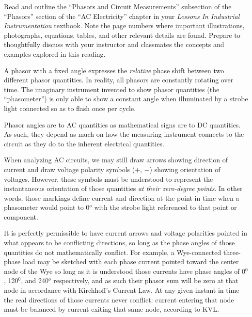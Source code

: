 

Read and outline the ``Phasors and Circuit Measurements'' subsection of the ``Phasors'' section of the ``AC Electricity'' chapter in your {\it Lessons In Industrial Instrumentation} textbook.  Note the page numbers where important illustrations, photographs, equations, tables, and other relevant details are found.  Prepare to thoughtfully discuss with your instructor and classmates the concepts and examples explored in this reading.













A phasor with a fixed angle expresses the {\it relative} phase shift between two different phasor quantities.  In reality, all phasors are constantly rotating over time.  The imaginary instrument invented to show phasor quantities (the ``phasometer'') is only able to show a constant angle when illuminated by a strobe light connected so as to flash once per cycle.

\vskip 10pt

Phasor angles are to AC quantities as mathematical signs are to DC quantities.  As such, they depend as much on how the measuring instrument connects to the circuit as they do to the inherent electrical quantities.

\vskip 10pt

When analyzing AC circuits, we may still draw arrows showing direction of current and draw voltage polarity symbols (+, $-$) showing orientation of voltages.  However, these symbols must be understood to represent the instantaneous orientation of those quantities {\it at their zero-degree points}.  In other words, those markings define current and direction at the point in time when a phasometer would point to 0$^{o}$ with the strobe light referenced to that point or component.

\vskip 10pt

It is perfectly permissible to have current arrows and voltage polarities pointed in what appears to be conflicting directions, so long as the phase angles of those quantities do not mathematically conflict.  For example, a Wye-connected three-phase load may be sketched with each phase current pointed toward the center node of the Wye so long as it is understood those currents have phase angles of 0$^{0}$, 120$^{0}$, and 240$^{o}$ respectively, and as such their phasor sum will be zero at that node in accordance with Kirchhoff's Current Law.  At any given instant in time the real directions of those currents never conflict: current entering that node must be balanced by current exiting that same node, according to KVL.





